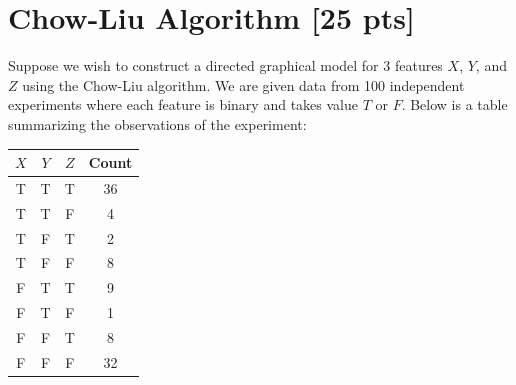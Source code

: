\documentclass[a4paper]{article}
\theoremstyle{definition}
\begin{document}
\newpage

\section{Chow-Liu Algorithm [25 pts]}
Suppose we wish to construct a directed graphical model for 3 features $X$, $Y$, and $Z$ using the Chow-Liu algorithm. We are given data from 100 independent experiments where each feature is binary and takes value $T$ or $F$. Below is a table summarizing the observations of the experiment:

\begin{table}[H]
        \centering
                \begin{tabular}{cccc}
                           $X$ & $Y$ & $Z$ & Count \\
                                \hline
                                T & T & T & 36 \\
                                \hline
                                T & T & F & 4 \\
                                \hline
                                T & F & T & 2 \\
                                \hline
                                T & F & F & 8 \\
                                \hline
                                F & T & T & 9 \\
                                \hline
                                F & T & F & 1 \\
                                \hline
                                F & F & T & 8 \\
                                \hline
                                F & F & F & 32 \\
                                \hline
                \end{tabular}
\end{table}
\end{document}
